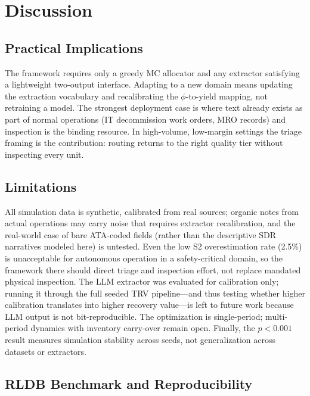 \documentclass[conference]{IEEEtran}
\begin{document}
\section{Discussion}

\subsection{Practical Implications}

The framework requires only a greedy MC allocator and any extractor satisfying a
lightweight two-output interface. Adapting to a new domain means updating the
extraction vocabulary and recalibrating the $\phi$-to-yield mapping, not
retraining a model. The strongest deployment case is where text already exists as
part of normal operations (IT decommission work orders, MRO records) and
inspection is the binding resource. In high-volume, low-margin settings the
triage framing is the contribution: routing returns to the right quality tier
without inspecting every unit.

\subsection{Limitations}

All simulation data is synthetic, calibrated from real sources; organic notes
from actual operations may carry noise that requires extractor recalibration, and
the real-world case of bare ATA-coded fields (rather than the descriptive SDR
narratives modeled here) is untested. Even the low S2 overestimation rate (2.5\%)
is unacceptable for autonomous operation in a safety-critical domain, so the
framework there should direct triage and inspection effort, not replace mandated
physical inspection. The LLM extractor was evaluated for calibration only; running
it through the full seeded TRV pipeline---and thus testing whether higher
calibration translates into higher recovery value---is left to future work because
LLM output is not bit-reproducible. The optimization is single-period;
multi-period dynamics with inventory carry-over remain open. Finally, the
$p{<}0.001$ result measures simulation stability across seeds, not generalization
across datasets or extractors.

\subsection{RLDB Benchmark and Reproducibility}
\end{document}
